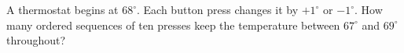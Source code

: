 A thermostat begins at $68^\circ$. Each button press changes it by $+1^\circ$ or $-1^\circ$. How many ordered sequences of ten presses keep the temperature between $67^\circ$ and $69^\circ$ throughout?
